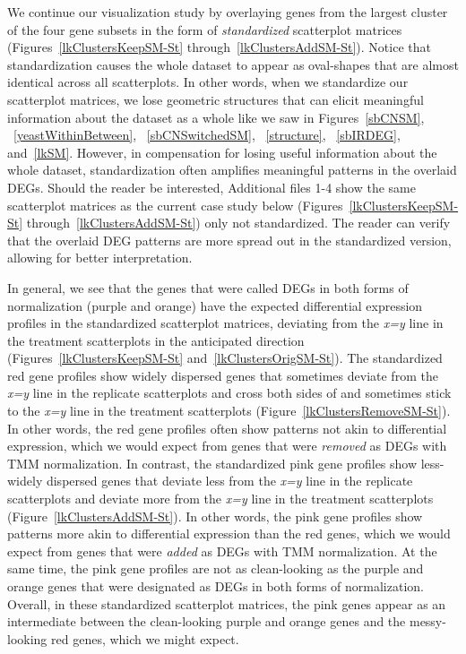 \documentclass{bmcart}
\begin{document}
\begin{linenumbers}
\begin{doublespacing}
We continue our visualization study by overlaying genes from the largest cluster of the four gene subsets in the form of \textit{standardized} scatterplot matrices (Figures~\ref{lkClustersKeepSM-St} through~\ref{lkClustersAddSM-St}). Notice that standardization causes the whole dataset to appear as oval-shapes that are almost identical across all scatterplots. In other words, when we standardize our scatterplot matrices, we lose geometric structures that can elicit meaningful information about the dataset as a whole like we saw in Figures~\ref{sbCNSM}, ~\ref{yeastWithinBetween}, ~\ref{sbCNSwitchedSM}, ~\ref{structure}, ~\ref{sbIRDEG}, and~\ref{lkSM}. However, in compensation for losing useful information about the whole dataset, standardization often amplifies meaningful patterns in the overlaid DEGs. Should the reader be interested, Additional files 1-4 show the same scatterplot matrices as the current case study below (Figures~\ref{lkClustersKeepSM-St} through~\ref{lkClustersAddSM-St}) only not standardized. The reader can verify that the overlaid DEG patterns are more spread out in the standardized version, allowing for better interpretation.

In general, we see that the genes that were called DEGs in both forms of normalization (purple and orange) have the expected differential expression profiles in the standardized scatterplot matrices, deviating from the \textit{x=y} line in the treatment scatterplots in the anticipated direction (Figures~\ref{lkClustersKeepSM-St} and~\ref{lkClustersOrigSM-St}). The standardized red gene profiles show widely dispersed genes that sometimes deviate from the \textit{x=y} line in the replicate scatterplots and cross both sides of and sometimes stick to the \textit{x=y} line in the treatment scatterplots (Figure~\ref{lkClustersRemoveSM-St}). In other words, the red gene profiles often show patterns not akin to differential expression, which we would expect from genes that were \textit{removed} as DEGs with TMM normalization. In contrast, the standardized pink gene profiles show less-widely dispersed genes that deviate less from the \textit{x=y} line in the replicate scatterplots and deviate more from the \textit{x=y} line in the treatment scatterplots (Figure~\ref{lkClustersAddSM-St}). In other words, the pink gene profiles show patterns more akin to differential expression than the red genes, which we would expect from genes that were \textit{added} as DEGs with TMM normalization. At the same time, the pink gene profiles are not as clean-looking as the purple and orange genes that were designated as DEGs in both forms of normalization. Overall, in these standardized scatterplot matrices, the pink genes appear as an intermediate between the clean-looking purple and orange genes and the messy-looking red genes, which we might expect.


\end{doublespacing}
\end{linenumbers}
\end{document}
